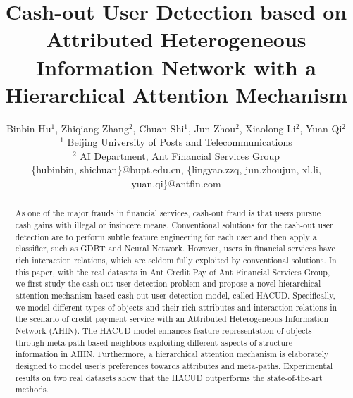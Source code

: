 \documentclass[letterpaper]{article} %
\begin{document}
%
\title{Cash-out User Detection based on Attributed Heterogeneous Information Network with a Hierarchical Attention Mechanism}

\author{Binbin Hu$^1$, Zhiqiang Zhang$^2$, Chuan Shi$^1$, Jun Zhou$^2$, Xiaolong Li$^2$,  Yuan Qi$^2$ \\
  $^1$ Beijing University of Posts and Telecommunications \\
  $^2$ AI Department, Ant Financial Services Group \\
  \{hubinbin, shichuan\}@bupt.edu.cn, \{lingyao.zzq, jun.zhoujun, xl.li, yuan.qi\}@antfin.com}

\maketitle

\begin{abstract}
As one of the major frauds in financial services, cash-out fraud is that users pursue cash gains with illegal or insincere means. Conventional solutions for the cash-out user detection are to perform subtle feature engineering for each user and then apply a classifier, such as GDBT and Neural Network. However, users in financial services have rich interaction relations, which are seldom fully exploited by conventional solutions. In this paper, with the real datasets in Ant Credit Pay of Ant Financial Services Group, we first study the cash-out user detection problem and propose a novel hierarchical attention mechanism based cash-out user detection model, called HACUD. Specifically, we model different types of objects and their rich attributes and interaction relations in the scenario of credit payment service with an Attributed Heterogeneous Information Network (AHIN). The HACUD model enhances feature representation of objects through meta-path based neighbors exploiting different aspects of structure information in AHIN. Furthermore,  a hierarchical attention mechanism is elaborately designed  to model user's preferences towards attributes and meta-paths.
Experimental results on two real datasets show that the HACUD outperforms the state-of-the-art methods.
\end{abstract}


%









\end{document}
